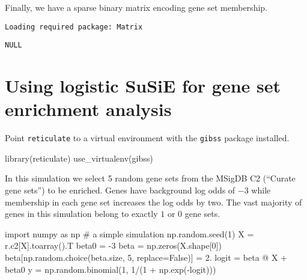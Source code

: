 \documentclass[
  letterpaper,
  DIV=11,
  numbers=noendperiod]{scrreprt}
\newenvironment{Shaded}{\begin{snugshade}}{\end{snugshade}}
\newcommand{\CommentTok}[1]{\textcolor[rgb]{0.37,0.37,0.37}{#1}}
\newcommand{\DecValTok}[1]{\textcolor[rgb]{0.68,0.00,0.00}{#1}}
\newcommand{\FloatTok}[1]{\textcolor[rgb]{0.68,0.00,0.00}{#1}}
\newcommand{\FunctionTok}[1]{\textcolor[rgb]{0.28,0.35,0.67}{#1}}
\newcommand{\ImportTok}[1]{\textcolor[rgb]{0.00,0.46,0.62}{#1}}
\newcommand{\NormalTok}[1]{\textcolor[rgb]{0.00,0.23,0.31}{#1}}
\newcommand{\OperatorTok}[1]{\textcolor[rgb]{0.37,0.37,0.37}{#1}}
\newcommand{\SpecialCharTok}[1]{\textcolor[rgb]{0.37,0.37,0.37}{#1}}
\newcommand{\StringTok}[1]{\textcolor[rgb]{0.13,0.47,0.30}{#1}}
\newcommand{\VariableTok}[1]{\textcolor[rgb]{0.07,0.07,0.07}{#1}}
\begin{document}
Finally, we have a sparse binary matrix encoding gene set membership.

\begin{Shaded}
\end{Shaded}

\begin{verbatim}
Loading required package: Matrix
\end{verbatim}

\begin{verbatim}
NULL
\end{verbatim}

\section{Using logistic SuSiE for gene set enrichment
analysis}\label{using-logistic-susie-for-gene-set-enrichment-analysis}

Point \texttt{reticulate} to a virtual environment with the
\texttt{gibss} package installed.

\begin{Shaded}
\begin{Highlighting}[]
\FunctionTok{library}\NormalTok{(reticulate)}
\FunctionTok{use\_virtualenv}\NormalTok{(}\StringTok{\textquotesingle{}gibss\textquotesingle{}}\NormalTok{)}
\end{Highlighting}
\end{Shaded}

In this simulation we select 5 random gene sets from the MSigDB C2
(``Curate gene sets'') to be enriched. Genes have background log odds of
\(-3\) while membership in each gene set increases the log odds by two.
The vast majority of genes in this simulation belong to exactly \(1\) or
\(0\) gene sets.

\begin{Shaded}
\begin{Highlighting}[]
\ImportTok{import}\NormalTok{ numpy }\ImportTok{as}\NormalTok{ np}
\CommentTok{\# a simple simulation}
\NormalTok{np.random.seed(}\DecValTok{1}\NormalTok{)}
\NormalTok{X }\OperatorTok{=}\NormalTok{ r.c2[}\StringTok{\textquotesingle{}X\textquotesingle{}}\NormalTok{].toarray().T}
\NormalTok{beta0 }\OperatorTok{=} \OperatorTok{{-}}\DecValTok{3}
\NormalTok{beta }\OperatorTok{=}\NormalTok{ np.zeros(X.shape[}\DecValTok{0}\NormalTok{])}
\NormalTok{beta[np.random.choice(beta.size, }\DecValTok{5}\NormalTok{, replace}\OperatorTok{=}\VariableTok{False}\NormalTok{)] }\OperatorTok{=} \FloatTok{2.}
\NormalTok{logit }\OperatorTok{=}\NormalTok{ beta }\OperatorTok{@}\NormalTok{ X }\OperatorTok{+}\NormalTok{ beta0}
\NormalTok{y }\OperatorTok{=}\NormalTok{ np.random.binomial(}\DecValTok{1}\NormalTok{, }\DecValTok{1}\OperatorTok{/}\NormalTok{(}\DecValTok{1} \OperatorTok{+}\NormalTok{ np.exp(}\OperatorTok{{-}}\NormalTok{logit)))}
\end{Highlighting}
\end{Shaded}
\end{document}
